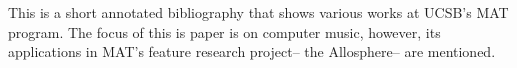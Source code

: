 This is a short annotated bibliography that shows various works at UCSB's MAT program. The focus of this is paper is on computer music, however, its applications in MAT's feature research project-- the Allosphere-- are mentioned. 
